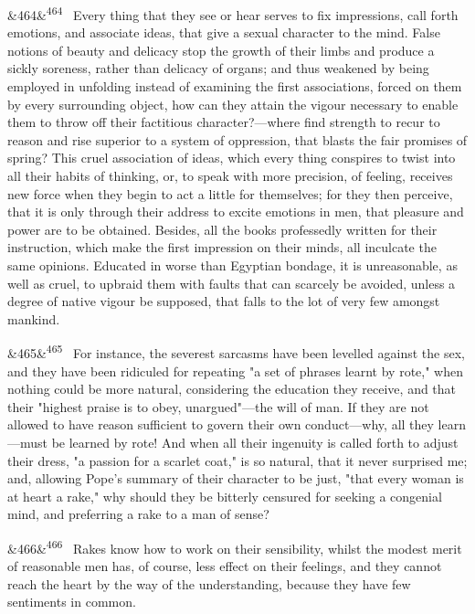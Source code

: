 \documentclass[12pt]{article}
\newcommand{\para}[1][]{\par\noindent\ifx&#1&\else\textsuperscript{\footnotesize #1}~\fi}
\begin{document}
\para[464] Every thing that they see or hear serves to fix impressions, call forth emotions, and associate ideas, that give a sexual character to the mind. False notions of beauty and delicacy stop the growth of their limbs and produce a sickly soreness, rather than delicacy of organs; and thus weakened by being employed in unfolding instead of examining the first associations, forced on them by every surrounding object, how can they attain the vigour necessary to enable them to throw off their factitious character?---where find strength to recur to reason and rise superior to a system of oppression, that blasts the fair promises of spring? This cruel association of ideas, which every thing conspires to twist into all their habits of thinking, or, to speak with more precision, of feeling, receives new force when they begin to act a little for themselves; for they then perceive, that it is only through their address to excite emotions in men, that pleasure and power are to be obtained. Besides, all the books professedly written for their instruction, which make the first impression on their minds, all inculcate the same opinions. Educated in worse than Egyptian bondage, it is unreasonable, as well as cruel, to upbraid them with faults that can scarcely be avoided, unless a degree of native vigour be supposed, that falls to the lot of very few amongst mankind.

\para[465] For instance, the severest sarcasms have been levelled against the sex, and they have been ridiculed for repeating "a set of phrases learnt by rote," when nothing could be more natural, considering the education they receive, and that their "highest praise is to obey, unargued"---the will of man. If they are not allowed to have reason sufficient to govern their own conduct---why, all they learn---must be learned by rote! And when all their ingenuity is called forth to adjust their dress, "a passion for a scarlet coat," is so natural, that it never surprised me; and, allowing Pope's summary of their character to be just, "that every woman is at heart a rake," why should they be bitterly censured for seeking a congenial mind, and preferring a rake to a man of sense?

\para[466] Rakes know how to work on their sensibility, whilst the modest merit of reasonable men has, of course, less effect on their feelings, and they cannot reach the heart by the way of the understanding, because they have few sentiments in common.
\end{document}
